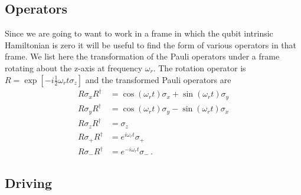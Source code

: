 \subsection{Operators}

Since we are going to want to work in a frame in which the qubit intrinsic Hamiltonian is zero it will be useful to find the form of various operators in that frame.
We list here the transformation of the Pauli operators under a frame rotating about the z-axis at frequency $\omega_r$.
The rotation operator is $R=\exp \left[-i \frac{1}{2} \omega_r t \sigma_z \right]$  and the transformed Pauli operators are \begin{align}
R\sigma_xR^{\dagger} & = \cos(\omega_r t)\sigma_x + \sin(\omega_r t) \sigma_y \nonumber \\
R\sigma_yR^{\dagger} & = \cos(\omega_r t)\sigma_y - \sin(\omega_r t) \sigma_x \nonumber \\
R\sigma_zR^{\dagger} & = \sigma_z \nonumber \\
R\sigma_+R^{\dagger} & = e^{i\omega_r t}\sigma_+ \nonumber \\
R\sigma_-R^{\dagger} & = e^{-i\omega_r t}\sigma_- \, . \nonumber \end{align}

\subsection{Driving}

